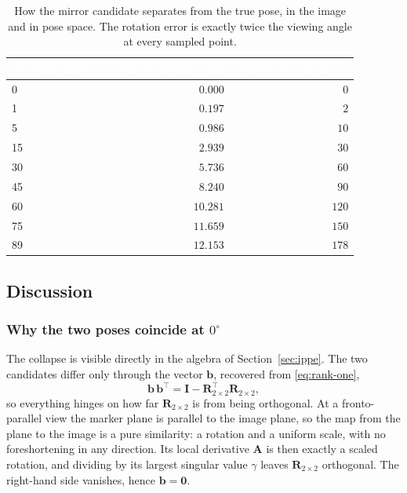\documentclass[11pt,a4paper]{article}
\theoremstyle{definition}
\theoremstyle{plain}
\theoremstyle{remark}
\newcommand{\thcell}[1]{\textcolor{white}{\textbf{#1}}}
\begin{document}
\begin{table}[h!]
\centering\small
\begin{tabularx}{\linewidth}{@{}Yrr@{}}
\toprule
{}\thcell{Viewing angle ($^\circ$)}&\thcell{Mirror RMSE (px)}&\thcell{Mirror rot.\ error ($^\circ$)}\\
&$0.000$&$0$\\
 1&$0.197$&$2$\\
5&$0.986$&$10$\\
 15&$2.939$&$30$\\
30&$5.736$&$60$\\
 45&$8.240$&$90$\\
60&$10.281$&$120$\\
 75&$11.659$&$150$\\
89&$12.153$&$178$\\
\bottomrule
\end{tabularx}
\caption{How the mirror candidate separates from the true pose, in the image
and in pose space. The rotation error is exactly twice the viewing angle at
every sampled point.}
\label{tab:sweep}
\end{table}

\subsection{Discussion}

\subsubsection{Why the two poses coincide at $0^\circ$}

The collapse is visible directly in the algebra of Section~\ref{sec:ippe}. The
two candidates differ only through the vector $\mathbf{b}$, recovered from
\eqref{eq:rank-one},
\begin{equation}
  \mathbf{b}\,\mathbf{b}^\top
  = \mathbf{I} - \mathbf{R}_{2\times2}^\top \mathbf{R}_{2\times2},
\end{equation}
so everything hinges on how far $\mathbf{R}_{2\times2}$ is from being
orthogonal. At a fronto-parallel view the marker plane is parallel to the image
plane, so the map from the plane to the image is a pure similarity: a rotation
and a uniform scale, with no foreshortening in any direction. Its local
derivative $\mathbf{A}$ is then exactly a scaled rotation, and dividing by its
largest singular value $\gamma$ leaves $\mathbf{R}_{2\times2}$ orthogonal. The
right-hand side vanishes, hence $\mathbf{b}=\mathbf{0}$.
\end{document}
